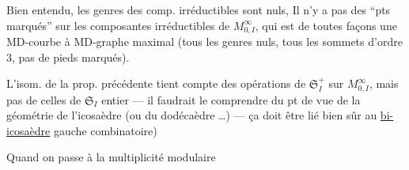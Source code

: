 Bien entendu, les genres des comp. irréductibles sont nuls, Il n'y a pas  des ``pts marqués'' sur  les  composantes irréductibles de $M^\infty_{0,I}$, qui est de toutes façons une MD-courbe  à MD-graphe maximal (tous les genres nuls, tous les sommets d'ordre $3$, pas de pieds marqués).

L'isom. de la prop. précédente tient compte des opérations de $\mathfrak S_I^+$  sur $M^\infty_{0,I}$, mais pas de celles de $\mathfrak S_I$  entier --- il faudrait le comprendre du pt de vue de la géométrie de l'icosaèdre  (ou du dodécaèdre \ldots) --- ça doit être lié bien sûr au \uline{bi-icosaèdre} gauche combinatoire)

Quand on passe à la multiplicité modulaire

